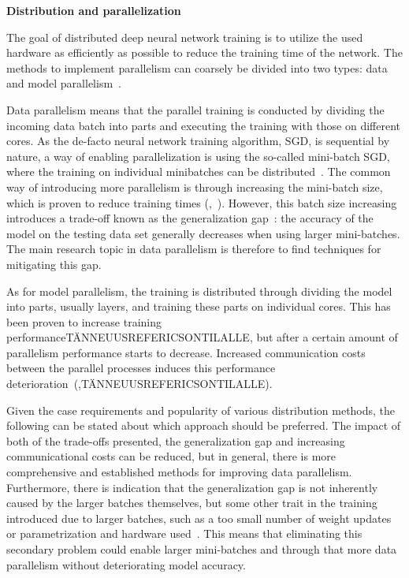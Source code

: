 \textbf{Distribution and parallelization}

The goal of distributed deep neural network training is to utilize the used hardware as efficiently as possible to reduce the training time of the network. The methods to implement parallelism can coarsely be divided into two types: data and model parallelism~\cite{ben-nunDemystifyingParallelDistributed2019}.

Data parallelism means that the parallel training is conducted by dividing the incoming data batch into parts and executing the training with those on different cores. As the de-facto neural network training algorithm, SGD, is sequential by nature, a way of enabling parallelization is using the so-called mini-batch SGD, where the training on individual minibatches can be distributed~\cite{DBLP:conf/icml/LeNCLPN11}. The common way of introducing more parallelism is through increasing the mini-batch size, which is proven to reduce training times (\cite{shallueMeasuringEffectsData2019},~\cite{smithDonDecayLearning2018}). However, this batch size increasing introduces a trade-off known as the generalization gap~\cite{hofferTrainLongerGeneralize2018}: the accuracy of the model on the testing data set generally decreases when using larger mini-batches. The main research topic in data parallelism is therefore to find techniques for mitigating this gap.

As for model parallelism, the training is distributed through dividing the model into parts, usually layers, and training these parts on individual cores. This has been proven to increase training performanceTÄNNEUUSREFERICSONTILALLE, but after a certain amount of parallelism performance starts to decrease. Increased communication costs between the parallel processes induces this performance deterioration~(\cite{ben-nunDemystifyingParallelDistributed2019},TÄNNEUUSREFERICSONTILALLE).

Given the case requirements and popularity of various distribution methods, the following can be stated about which approach should be preferred. The impact of both of the trade-offs presented, the generalization gap and increasing communicational costs can be reduced, but in general, there is more comprehensive and established methods for improving data parallelism. Furthermore, there is indication that the generalization gap is not inherently caused by the larger batches themselves, but some other trait in the training introduced due to larger batches, such as a too small number of weight updates~\cite{hofferTrainLongerGeneralize2018} or parametrization and hardware used~\cite{shallueMeasuringEffectsData2019}. This means that eliminating this secondary problem could enable larger mini-batches and through that more data parallelism without deteriorating model accuracy.

